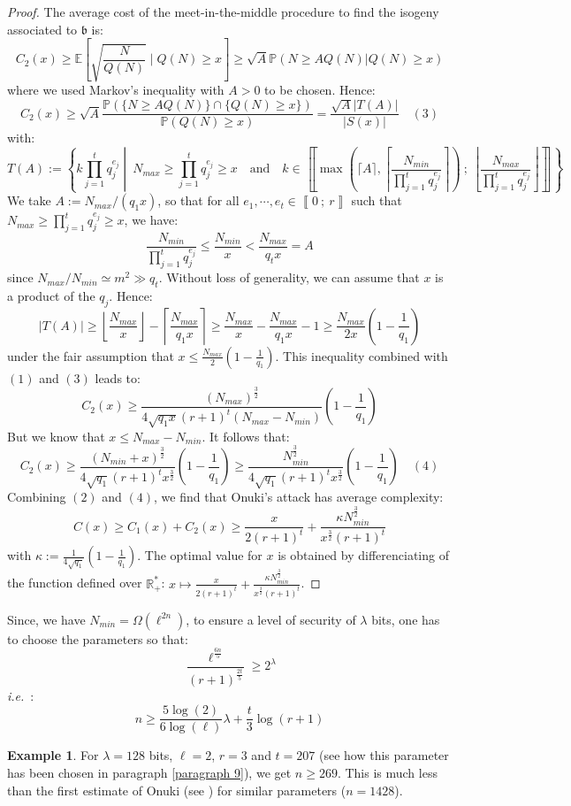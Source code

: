 \documentclass[a4paper,10pt]{report}
\theoremstyle{definition}
\theoremstyle{plain}
\theoremstyle{definition}
\newtheorem{example}[definition]{Example}
\newcommand{\ie}{\emph{i.e.}\ }
\newcommand{\R}{\mathbb{R}}
\newcommand{\E}{\mathbb{E}}
\renewcommand{\i}[2]{\left\llbracket #1~;~#2\right\rrbracket}
\renewcommand{\(}{\left(}
\renewcommand{\)}{\right)}
\renewcommand{\P}{\mathbb{P}}
\newcommand{\mf}[1]{\mathfrak{#1}}
\begin{document}
\begin{proof}
The average cost of the meet-in-the-middle procedure to find the isogeny associated to $\mf{b}$ is:
\[C_2(x)\geq \E\left[\sqrt{\frac{N}{Q(N)}}\mid Q(N)\geq x\right]\geq \sqrt{A}\P(N\geq A Q(N)|Q(N)\geq x)\]
where we used Markov's inequality with $A>0$ to be chosen. Hence:
\[C_2(x)\geq  \sqrt{A}\frac{\P(\{N\geq A Q(N)\}\cap\{Q(N)\geq x\})}{\P(Q(N)\geq x)}=\frac{\sqrt{A}|T(A)|}{|S(x)|} \quad (3)\]
with:
\[T(A):=\left\{k\prod_{j=1}^tq_j^{e_j}\middle| \ N_{max}\geq\prod_{j=1}^tq_j^{e_j}\geq x \quad \mbox{and} \quad k\in\i{\max\(\lceil A\rceil,\left\lceil\frac{N_{min}}{\prod_{j=1}^t q_j^{e_j}}\right\rceil\)}{\left\lfloor\frac{N_{max}}{\prod_{j=1}^t q_j^{e_j}}\right\rfloor}\right\}\]
We take $A:=N_{max}/(q_1 x)$, so that for all $e_1, \cdots,e_t\in\i{0}{r}$ such that $N_{max}\geq \prod_{j=1}^tq_j^{e_j}\geq x$, we have:
\[\frac{N_{min}}{\prod_{j=1}^tq_j^{e_j}}\leq \frac{N_{min}}{x}<\frac{N_{max}}{q_tx}=A\]
since $N_{max}/N_{min}\simeq m^2\gg q_t$. Without loss of generality, we can assume that $x$ is a product of the $q_j$. Hence:
\[|T(A)|\geq\left\lfloor\frac{N_{max}}{x}\right\rfloor-\left\lceil\frac{N_{max}}{q_1x}\right\rceil\geq \frac{N_{max}}{x}-\frac{N_{max}}{q_1x}-1\geq\frac{N_{max}}{2x}\(1-\frac{1}{q_1}\)\]
under the fair assumption that $x\leq \frac{N_{max}}{2}\(1-\frac{1}{q_1}\)$. This inequality combined with $(1)$ and $(3)$ leads to:
\[C_2(x)\geq \frac{(N_{max})^{\frac{3}{2}}}{4\sqrt{q_1 x}(r+1)^t(N_{max}-N_{min})}\(1-\frac{1}{q_1}\)\]
But we know that $x\leq N_{max}-N_{min}$. It follows that:
\[C_2(x)\geq  \frac{(N_{min}+x)^{\frac{3}{2}}}{4\sqrt{q_1}(r+1)^tx^{\frac{3}{2}}}\(1-\frac{1}{q_1}\)\geq \frac{N_{min}^{\frac{3}{2}}}{4\sqrt{q_1}(r+1)^tx^{\frac{3}{2}}}\(1-\frac{1}{q_1}\)\quad (4)\]
Combining $(2)$ and $(4)$, we find that Onuki's attack has average complexity:
\[C(x)\geq C_1(x)+C_2(x)\geq  \frac{x}{2(r+1)^t}+\frac{\kappa N_{min}^{\frac{3}{2}}}{x^{\frac{3}{2}}(r+1)^t}\]
with $\kappa:=\frac{1}{4\sqrt{q_1}}\(1-\frac{1}{q_1}\)$. The optimal value for $x$ is obtained by differenciating of the function defined over $\R_+^*$:  $x\longmapsto \frac{x}{2(r+1)^t}+\frac{\kappa N_{min}^{\frac{3}{2}}}{x^{\frac{3}{2}}(r+1)^t}$.
\end{proof}

Since, we have $N_{min}=\Omega(\ell^{2n})$, to ensure a level of security of $\lambda$ bits, one has to choose the parameters so that:
\[\frac{\ell^{\frac{6n}{5}}}{(r+1)^{\frac{2t}{5}}}\geq 2^\lambda\]
\ie:
\[n\geq \frac{5\log(2)}{6\log(\ell)}\lambda+\frac{t}{3}\log(r+1)\]

\begin{example}
For $\lambda=128$ bits, $\ell=2$, $r=3$ and $t=207$ (see how this parameter has been chosen in paragraph \ref{paragraph 9}), we get $n\geq 269$. This is much less than the first estimate of Onuki (see \cite[§ 6.3]{Onuki}) for similar parameters ($n=1428$).
\end{example}
\end{document}
